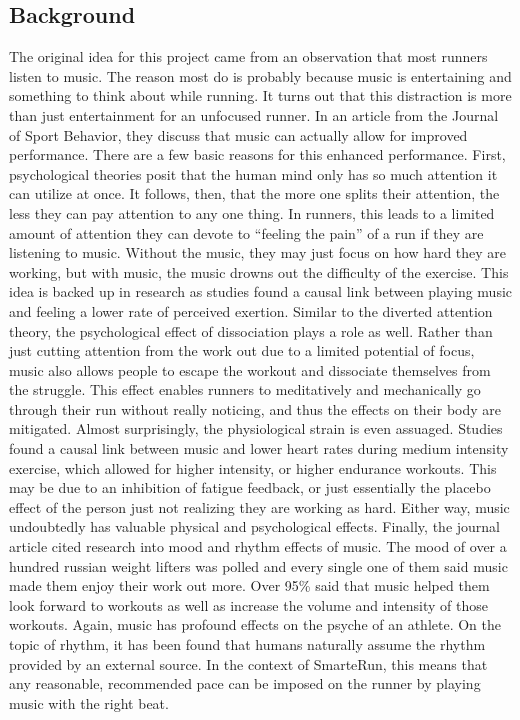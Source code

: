 \documentclass[twoside]{article}
\begin{document}
\begin{multicols}{2}

\section{Background}
\indent The original idea for this project came from an observation that most runners listen to music. The reason most do is probably because music is entertaining and something to think about while running. It turns out that this distraction is more than just entertainment for an unfocused runner. In an article from the Journal of Sport Behavior, they discuss that music can actually allow for improved performance. There are a few basic reasons for this enhanced performance. 
	First, psychological theories posit that the human mind only has so much attention it can utilize at once. It follows, then, that the more one splits their attention, the less they can pay attention to any one thing. In runners, this leads to a limited amount of attention they can devote to “feeling the pain” of a run if they are listening to music. Without the music, they may just focus on how hard they are working, but with music, the music drowns out the difficulty of the exercise. This idea is backed up in research as studies found a causal link between playing music and feeling a lower rate of perceived exertion. 
	Similar to the diverted attention theory, the psychological effect of dissociation plays a role as well. Rather than just cutting attention from the work out due to a limited potential of focus, music also allows people to escape the workout and dissociate themselves from the struggle. This effect enables runners to meditatively and mechanically go through their run without really noticing, and thus the effects on their body are mitigated. Almost surprisingly, the physiological strain is even assuaged. Studies found a causal link between music and lower heart rates during medium intensity exercise, which allowed for higher intensity, or higher endurance workouts. This may be due to an inhibition of fatigue feedback, or just essentially the placebo effect of the person just not realizing they are working as hard. Either way, music undoubtedly has valuable physical and psychological effects. 
	Finally, the journal article cited research into mood and rhythm effects of music. The mood of over a hundred russian weight lifters was polled and every single one of them said music made them enjoy their work out more. Over 95\% said that music helped them look forward to workouts as well as increase the volume and intensity of those workouts. Again, music has profound effects on the psyche of an athlete. On the topic of rhythm, it has been found that humans naturally assume the rhythm provided by an external source. In the context of SmarteRun, this means that any reasonable, recommended pace can be imposed on the runner by playing music with the right beat. 

\end{multicols}
\end{document}

